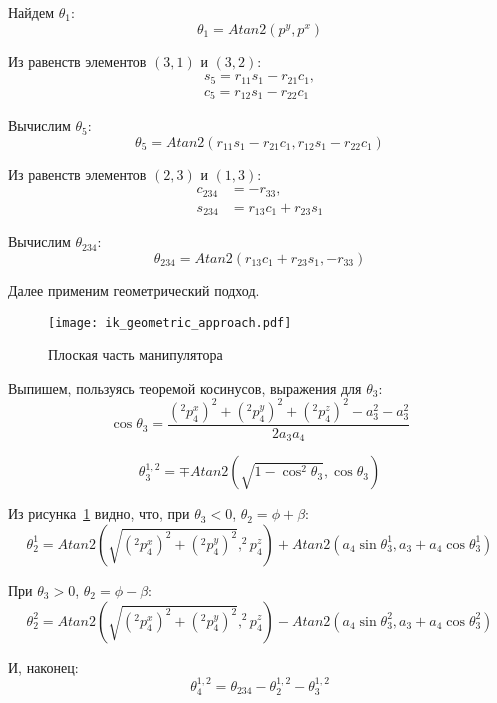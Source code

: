 Найдем $\theta_1$:
\begin{equation}
	\theta_1 = Atan2(p^y, p^x)
\end{equation}

Из равенств элементов $(3,1)$ и $(3,2)$:
\begin{align*}
	s_{5} = r_{11} s_{1} - r_{21} c_{1},\\
	c_{5} =  r_{12} s_{1} - r_{22} c_{1}
\end{align*}

Вычислим $\theta_5$:
\begin{equation}
	\theta_5 = Atan2(r_{11} s_{1} - r_{21} c_{1}, r_{12} s_{1} - r_{22} c_{1})
\end{equation}

Из равенств элементов $(2,3)$ и $(1,3)$:
\begin{align*}
	c_{234} &= -r_{33},\\
	s_{234} &= r_{13} c_{1} + r_{23} s_{1}
\end{align*}

Вычислим $\theta_{234}$:
\begin{equation}
	\theta_{234} = Atan2(r_{13} c_{1} + r_{23} s_{1}, -r_{33}) 
\end{equation}

Далее применим геометрический подход.

\begin{figure}[h!]
	\centering
	\texttt{[image: ik\_geometric\_approach.pdf]}
	\caption{Плоская часть манипулятора}
	\label{ik_geometric}
\end{figure}

Выпишем, пользуясь теоремой косинусов, выражения для $\theta_3$:
\begin{equation}
	\cos{\theta_3} = \frac{(^2p_4^x)^2 + (^2p_4^y)^2 + (^2p_4^z)^2 - a_3^2 - a_3^2}{2 a_3 a_4}
\end{equation}

\begin{equation}
	\theta_3^{1,2} = \mp Atan2(\sqrt{1 - \cos^2{\theta_3}}, \cos{\theta_3})
\end{equation}

Из рисунка~\ref{ik_geometric} видно, что, при $\theta_3 < 0$, $\theta_2 = \phi + \beta$:
\begin{equation}
	\theta_2^1 = Atan2(\sqrt{(^2p_4^x)^2 + (^2p_4^y)^2}, ^2p_4^z) + Atan2(a_4 \sin{\theta_3^1}, a_3 + a_4 \cos{\theta_3^1})
\end{equation}

При $\theta_3 > 0$, $\theta_2 = \phi - \beta$:
\begin{equation}
	\theta_2^2 = Atan2(\sqrt{(^2p_4^x)^2 + (^2p_4^y)^2}, ^2p_4^z) - Atan2(a_4 \sin{\theta_3^2}, a_3 + a_4 \cos{\theta_3^2})
\end{equation}

И, наконец:
\begin{equation}
	\theta_4^{1,2} = \theta_{234} - \theta_{2}^{1,2} - \theta_{3}^{1,2}
\end{equation}



\newpage